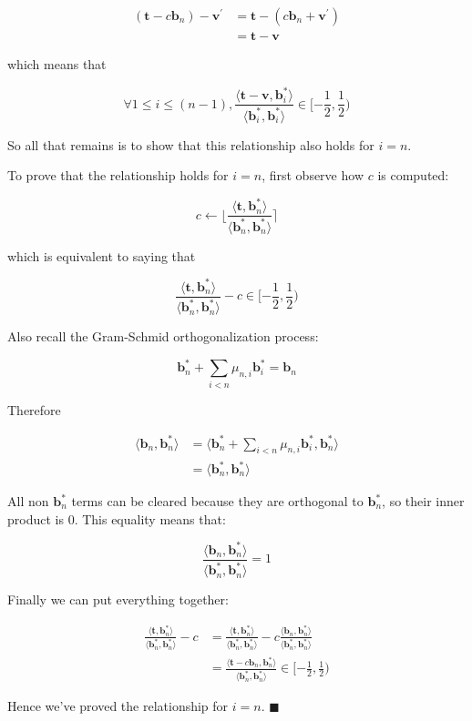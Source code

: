 $$
\begin{aligned}
(\mathbf{t} - c\mathbf{b}_n) - \mathbf{v}^\prime 
&= \mathbf{t} - (c\mathbf{b}_n + \mathbf{v}^\prime) \\
&= \mathbf{t} - \mathbf{v}
\end{aligned}
$$

which means that

$$
\forall 1 \leq i \leq (n-1), 
\frac{
    \langle
        \mathbf{t} - \mathbf{v}, 
        \mathbf{b}_i^\ast
    \rangle
}{
    \langle
        \mathbf{b}_i^\ast, \mathbf{b}_i^\ast
    \rangle
} \in [-\frac{1}{2}, \frac{1}{2})
$$

So all that remains is to show that this relationship also holds for $i = n$.

To prove that the relationship holds for $i = n$, first observe how $c$ is computed:

$$
c \leftarrow \lfloor \frac{\langle\mathbf{t}, \mathbf{b}_n^\ast\rangle}{\langle\mathbf{b}_n^\ast, \mathbf{b}_n^\ast\rangle} \rceil
$$

which is equivalent to saying that

$$
\frac{
    \langle\mathbf{t}, \mathbf{b}_n^\ast\rangle
}{
    \langle\mathbf{b}_n^\ast, \mathbf{b}_n^\ast\rangle
}
- c \in [-\frac{1}{2}, \frac{1}{2})
$$

Also recall the Gram-Schmid orthogonalization process:

$$
\mathbf{b}_n^\ast +\sum_{i<n}\mu_{n, i}\mathbf{b}_i^\ast = \mathbf{b}_n
$$

Therefore

$$
\begin{aligned}
\langle\mathbf{b}_n, \mathbf{b}_n^\ast\rangle
&= \langle 
    \mathbf{b}_n^\ast +\sum_{i<n}\mu_{n, i}\mathbf{b}_i^\ast, \mathbf{b}_n^\ast
\rangle \\
&= \langle\mathbf{b}_n^\ast, \mathbf{b}_n^\ast\rangle
\end{aligned}
$$

All non $\mathbf{b}_n^\ast$ terms can be cleared because they are orthogonal to $\mathbf{b}_n^\ast$, so their inner product is 0. This equality means that:

$$
\frac{
    \langle\mathbf{b}_n, \mathbf{b}_n^\ast\rangle
}{
    \langle\mathbf{b}_n^\ast, \mathbf{b}_n^\ast\rangle
} = 1
$$

Finally we can put everything together:

$$
\begin{aligned}
\frac{
    \langle\mathbf{t}, \mathbf{b}_n^\ast\rangle
}{
    \langle\mathbf{b}_n^\ast, \mathbf{b}_n^\ast\rangle
}
- c 
&= \frac{
    \langle\mathbf{t}, \mathbf{b}_n^\ast\rangle
}{
    \langle\mathbf{b}_n^\ast, \mathbf{b}_n^\ast\rangle
}
- c \frac{
    \langle\mathbf{b}_n, \mathbf{b}_n^\ast\rangle
}{
    \langle\mathbf{b}_n^\ast, \mathbf{b}_n^\ast\rangle
} \\
&= \frac{
    \langle\mathbf{t} - c\mathbf{b}_n, \mathbf{b}_n^\ast\rangle
}{
    \langle\mathbf{b}_n^\ast, \mathbf{b}_n^\ast\rangle
}
\in [-\frac{1}{2}, \frac{1}{2})
\end{aligned}
$$

Hence we've proved the relationship for $i = n$. $\blacksquare$